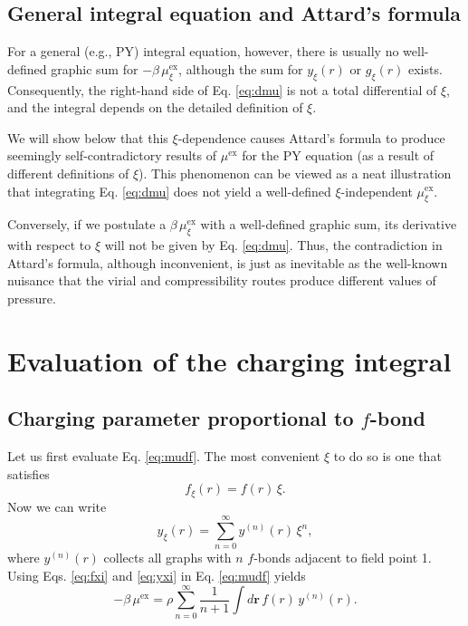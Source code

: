 \documentclass[notitlepage, preprint]{revtex4-1}
\newcommand{\vct}[1]{\mathbf{#1}}
\providecommand{\vr}{} %
\renewcommand{\vr}{\vct{r}}
\newcommand{\supex}[1]{ { { #1 }^{ \mathrm{ex} } } }
\newcommand{\muex}{\supex{\mu}}
\newcommand{\muexxi}{\mu^{ \mathrm{ex} }_\xi}
\begin{document}
\subsection{General integral equation and Attard's formula}



For a general (e.g., PY) integral equation, however,
there is usually no well-defined graphic sum for
$-\beta \, \muexxi$,
although the sum for $y_\xi(r)$ or $g_\xi(r)$ exists.
%
Consequently,
the right-hand side of Eq. \eqref{eq:dmu}
is not a total differential of $\xi$,
and the integral
depends on the detailed definition of $\xi$.




We will show below that this $\xi$-dependence
causes Attard's formula\cite{attard1991}
to produce seemingly self-contradictory results of $\muex$
for the PY equation
(as a result of different definitions of $\xi$).
%
This phenomenon can be viewed as a neat illustration that
integrating Eq. \eqref{eq:dmu} does not yield a well-defined $\xi$-independent $\muexxi$.



Conversely,
if we postulate a $\beta \, \muexxi$ with a well-defined graphic sum,
its derivative with respect to $\xi$
will not be given by Eq. \eqref{eq:dmu}.
%
Thus, the contradiction in Attard's formula,
although inconvenient, is just as inevitable as
the well-known nuisance that the virial and compressibility routes
produce different values of pressure.





\section{Evaluation of the charging integral}



\subsection{Charging parameter proportional to $f$-bond}



Let us first evaluate Eq. \eqref{eq:mudf}.
%
The most convenient $\xi$ to do so is one that satisfies
\begin{equation}
  f_\xi(r) = f(r) \, \xi.
  \label{eq:fxi}
\end{equation}
Now we can write
\begin{equation}
  y_\xi(r) = \sum_{n = 0}^\infty y^{(n)}(r) \, \xi^n,
\label{eq:yxi}
\end{equation}
where $y^{(n)}(r)$ collects all graphs
with $n$ $f$-bonds adjacent to field point 1.
%
Using Eqs. \eqref{eq:fxi} and \eqref{eq:yxi} in Eq. \eqref{eq:mudf} yields
\begin{equation}
  -\beta \, \muex
=
  \rho \sum_{n = 0}^\infty
  \frac{1}{n+1}
  \int d\vr \, f(r) \, y^{(n)}(r).
\label{eq:mu_fyseries}
\end{equation}
\end{document}
